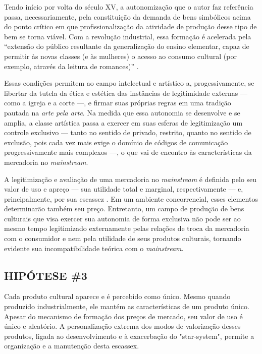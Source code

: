 \documentclass[
]{article}
\newenvironment{citacao}
    {\begin{quoting}[rightmargin=0cm,leftmargin=4cm]
    \begin{singlespace}
    \footnotesize
    }
    {\end{singlespace}
    \end{quoting}
    }
\begin{document}
Tendo início por volta do século XV, a autonomização que o autor faz
referência passa, necessariamente, pela constituição da demanda de bens
simbólicos acima do ponto crítico em que profissionalização da atividade
de produção desse tipo de bem se torna viável. Com a revolução
industrial, essa formação é acelerada pela ``extensão do público
resultante da generalização do ensino elementar, capaz de permitir às
novas classes (e às mulheres) o acesso ao consumo cultural (por exemplo,
através da leitura de romances)'' \citep[p.~102]{bourdieu}.

Essas condições permitem ao campo intelectual e artístico a,
progessivamente, se libertar da tutela da ética e estética das
instâncias de legitimidade externas --- como a igreja e a corte ---, e
firmar suas próprias regras em uma tradição pautada na \emph{arte pela
arte}. Na medida que essa autonomia se desenvolve e se amplia, a classe
artística passa a exercer em suas esferas de legitimização um controle
exclusivo --- tanto no sentido de privado, restrito, quanto no sentido
de exclusão, pois cada vez mais exige o domínio de códigos de
comunicação progressivamente mais complexos ---, o que vai de encontro
às características da mercadoria no \emph{mainstream}.

A legitimização e avaliação de uma mercadoria no \emph{mainstream} é
definida pelo seu valor de uso e apreço --- sua utilidade total e
marginal, respectivamente --- e, principalmente, por sua escassez
\citep[p.~67-68]{jevons}. Em um ambiente concorrencial, esses elementos
determinarão também seu preço. Entretanto, um campo de produção de bens
culturais que visa exercer sua autonomia de forma exclusiva não pode ser
ao mesmo tempo legitimizado externamente pelas relações de troca da
mercadoria com o consumidor e nem pela utilidade de seus produtos
culturais, tornando evidente sua incompatibilidade teórica com o
\emph{mainstream}.

\hypertarget{hipuxf3tese-3}{%
\subsection{HIPÓTESE \#3}\label{hipuxf3tese-3}}

\begin{citacao}
Cada produto cultural aparece e é percebido como único. Mesmo quando produzido industrialmente, ele mantém as características de um produto único. Apesar do mecanismo de formação dos preços de mercado, seu valor de uso é único e aleatório. A personalização extrema dos modos de valorização desses produtos, ligada ao desenvolvimento e à exacerbação do "star-system", permite a organização e a manutenção desta escassex. \citep[p.~31]{herscovici}
\end{citacao}
\end{document}
